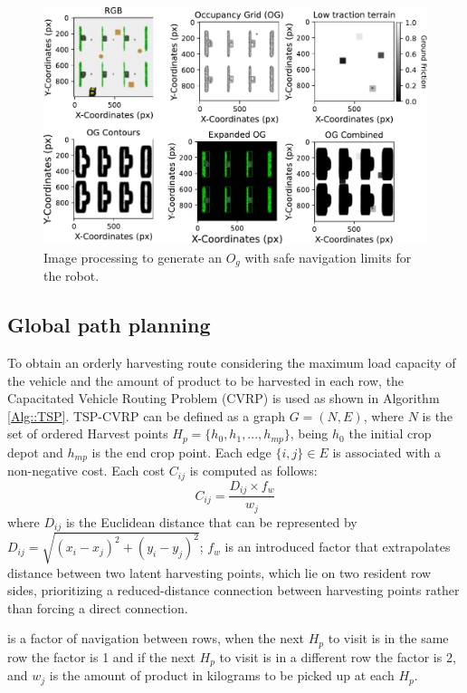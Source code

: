\documentclass[conference]{IEEEtran}
\begin{document}
\begin{figure}[t!]
    \centering
    \includegraphics[width=\linewidth]{Images/image_process_6.pdf}
    \caption{Image processing to generate an $O_{g}$ with safe navigation limits for the robot. }
    \label{fig:rgb1}
\end{figure}

\subsection{Global path planning}
\label{Subsec::global_path_planning}

To obtain an orderly harvesting route considering the maximum load capacity of the vehicle and the amount of product to be harvested in each row, the Capacitated Vehicle Routing Problem (CVRP) is used as shown in Algorithm \ref{Alg::TSP}. TSP-CVRP can be defined as a graph $G = (N, E)$, where $N$ is the set of ordered Harvest points $H_p = \{h_0, h_1, . . . , h_{mp}\}$, being $h_{0}$ the initial crop depot and $h_{mp}$ is the end crop point. Each edge $\{i, j\} \in E$ is associated with a non-negative cost. Each cost $C_{ij}$ is computed as follows:
\begin{equation}
C_{ij} = \frac{D_{ij} \times f_{w}}{w_{j} }    
\end{equation}
\noindent where $D_{ij}$ is the Euclidean distance that can be represented by $D_{ij} = \sqrt{(x_i - x_j)^2 + (y_i - y_j)^2}$; $f_{w}$ is an introduced factor that extrapolates distance between two latent harvesting points, which lie on two resident row sides, prioritizing a reduced-distance connection between harvesting points rather than forcing a direct connection. 


is a factor of navigation between rows, when the next $H_{p}$ to visit is in the same row the factor is 1 and if the next  $H_{p}$  to visit is in a different row the factor is 2, and $w_{j}$ is the amount of product in kilograms to be picked up at each $H_{p}$.
\end{document}
